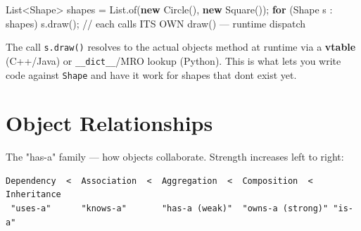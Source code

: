 \documentclass[11pt]{article}
\newenvironment{Shaded}{\begin{snugshade}}{\end{snugshade}}
\newcommand{\BuiltInTok}[1]{\textcolor[rgb]{0.50,0.55,0.55}{#1}}
\newcommand{\CommentTok}[1]{\textcolor[rgb]{0.48,0.49,0.49}{#1}}
\newcommand{\ControlFlowTok}[1]{\textcolor[rgb]{0.99,0.74,0.29}{\textbf{#1}}}
\newcommand{\FunctionTok}[1]{\textcolor[rgb]{0.56,0.27,0.68}{#1}}
\newcommand{\KeywordTok}[1]{\textcolor[rgb]{0.81,0.81,0.76}{\textbf{#1}}}
\newcommand{\NormalTok}[1]{\textcolor[rgb]{0.81,0.81,0.76}{#1}}
\newcommand{\OperatorTok}[1]{\textcolor[rgb]{0.81,0.81,0.76}{#1}}
\begin{document}

\begin{Shaded}
\begin{Highlighting}[]
\BuiltInTok{List}\OperatorTok{\textless{}}\BuiltInTok{Shape}\OperatorTok{\textgreater{}}\NormalTok{ shapes }\OperatorTok{=} \BuiltInTok{List}\OperatorTok{.}\FunctionTok{of}\OperatorTok{(}\KeywordTok{new} \FunctionTok{Circle}\OperatorTok{(),} \KeywordTok{new} \FunctionTok{Square}\OperatorTok{());}
\ControlFlowTok{for} \OperatorTok{(}\BuiltInTok{Shape}\NormalTok{ s }\OperatorTok{:}\NormalTok{ shapes}\OperatorTok{)}\NormalTok{ s}\OperatorTok{.}\FunctionTok{draw}\OperatorTok{();}   \CommentTok{// each calls ITS OWN draw() — runtime dispatch}
\end{Highlighting}
\end{Shaded}

The call \texttt{s.draw()} resolves to the actual object\textquotesingle s method at runtime via a \textbf{vtable} (C++/Java) or \texttt{\_\_dict\_\_}/MRO lookup (Python). This is what lets you write code against \texttt{Shape} and have it work for shapes that don\textquotesingle t exist yet.

\section{Object Relationships}\label{object-relationships}

The "has-a" family --- how objects collaborate. Strength increases left to right:

\setcodelang{}

\begin{verbatim}
Dependency  <  Association  <  Aggregation  <  Composition  <  Inheritance
 "uses-a"      "knows-a"       "has-a (weak)"  "owns-a (strong)" "is-a"
\end{verbatim}
\end{document}
